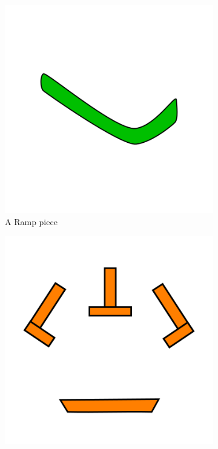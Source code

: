 \documentclass{l4proj}
\begin{document}
\begin{figure}
    \centering
    \begin{subfigure}[b]{0.20\textwidth}
        \includegraphics[width=\textwidth]{images/ramp.png}
        \caption{A Ramp piece \\}
        \label{fig:ramp}
    \end{subfigure}
    \begin{subfigure}[b]{0.20\textwidth}
        \includegraphics[width=\textwidth]{images/crossover.png}

\end{subfigure}
\end{figure}
\end{document}
